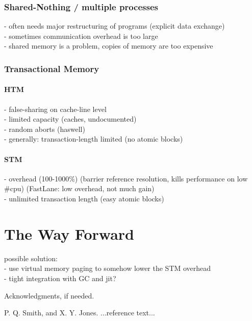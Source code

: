 \documentclass{sigplanconf}
\begin{document}
\subsubsection{Shared-Nothing / multiple processes}

- often needs major restructuring of programs (explicit data exchange)\\
- sometimes communication overhead is too large\\
- shared memory is a problem, copies of memory are too expensive

\subsubsection{Transactional Memory}
\paragraph{HTM}

- false-sharing on cache-line level\\
- limited capacity (caches, undocumented)\\
- random aborts (haswell)\\
- generally: transaction-length limited (no atomic blocks)

\paragraph{STM}

- overhead (100-1000\%) (barrier reference resolution, kills performance on low \#cpu)
(FastLane: low overhead, not much gain)\\
- unlimited transaction length (easy atomic blocks)

\section{The Way Forward}
possible solution:\\
- use virtual memory paging to somehow lower the STM overhead\\
- tight integration with GC and jit?




\acks

Acknowledgments, if needed.





\begin{thebibliography}{}
\softraggedright

P. Q. Smith, and X. Y. Jones. ...reference text...

\end{thebibliography}
\end{document}
